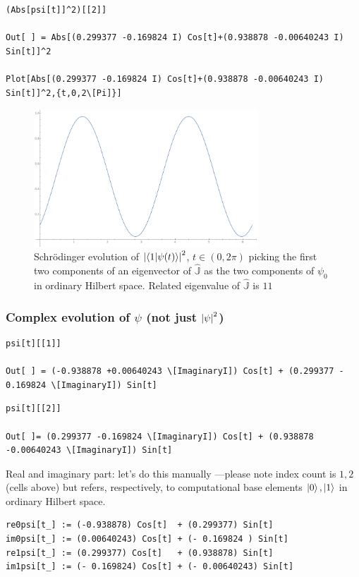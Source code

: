 \begin{lstlisting}
(Abs[psi[t]]^2)[[2]]

Out[ ] = Abs[(0.299377 -0.169824 I) Cos[t]+(0.938878 -0.00640243 I) Sin[t]]^2
  
Plot[Abs[(0.299377 -0.169824 I) Cos[t]+(0.938878 -0.00640243 I) Sin[t]]^2,{t,0,2\[Pi]}]  \end{lstlisting}
\begin{figure}
  \centering
  \includegraphics[width=0.75\textwidth]{img/probB_1.png}
  \caption[(from notebook)]{
    Schr{\"o}dinger evolution of
    $\qty|\braket{1}{\psi(t)}|^2$, $t \in (0, 2\pi) $
    picking the first two components of an eigenvector of $\hat{\mathbb{J}}$
    as the two components of $\psi_0$ in ordinary Hilbert space.
    Related eigenvalue of $\hat{\mathbb{J}}$ is $11$
  }
\end{figure}

\subsubsection{Complex evolution of $\psi$ (not just $\qty|\psi|^2$)}
\begin{lstlisting}
psi[t][[1]]

Out[ ] = (-0.938878 +0.00640243 \[ImaginaryI]) Cos[t] + (0.299377 - 0.169824 \[ImaginaryI]) Sin[t]
\end{lstlisting}
\begin{lstlisting}
psi[t][[2]]

Out[ ]= (0.299377 -0.169824 \[ImaginaryI]) Cos[t] + (0.938878 -0.00640243 \[ImaginaryI]) Sin[t]
\end{lstlisting}  
Real and imaginary part: let's do this manually ---please note index count is
$1, 2$ (cells above)
but refers, respectively, to computational base elements
$\ket{0}, \ket{1}$ in ordinary Hilbert space.
\begin{lstlisting}
re0psi[t_] := (-0.938878) Cos[t]  + (0.299377) Sin[t]
im0psi[t_] := (0.00640243) Cos[t] + (- 0.169824 ) Sin[t]
re1psi[t_] := (0.299377) Cos[t]   + (0.938878) Sin[t]
im1psi[t_] := (- 0.169824) Cos[t] + (- 0.00640243) Sin[t] 
\end{lstlisting}

